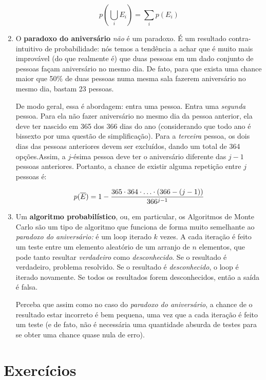 \documentclass{article}
\begin{document}
\begin{enumerate}
        \[ p\left(\bigcup_i E_i\right) = \sum_i p(E_i) \] 

    \item O \textbf{paradoxo do aniversário} \textit{não} é um paradoxo. É um resultado contra-intuitivo de probabilidade: nós temos a tendência a achar que é muito mais improvável (do que realmente é) que duas pessoas em um dado conjunto de pessoas façam aniversário no mesmo dia. De fato, para que exista uma chance maior que 50\% de duas pessoas numa mesma sala fazerem aniversário no mesmo dia, bastam 23 pessoas.

        De modo geral, essa é abordagem: entra uma pessoa. Entra uma \textit{segunda} pessoa. Para ela não fazer aniversário no mesmo dia da pessoa anterior, ela deve ter nascido em 365 dos 366 dias do ano (considerando que todo ano é bissexto por uma questão de simplificação). Para a \textit{terceira} pessoa, os dois dias das pessoas anteriores devem ser excluídos, dando um total de 364 opções.Assim, a \( j \)-ésima pessoa deve ter o aniversário diferente das \( j - 1 \) pessoas anteriores. Portanto, a chance de existir alguma repetição entre \( j \) pessoas é:

        \[ p(\overline{E}) = 1 - \frac{365 \cdot 364 \cdot \mathellipsis \cdot (366 - (j - 1))}{366^{j-1}} \] 

    \sloppy \item Um \textbf{algoritmo probabilístico}, ou, em particular, os Algoritmos de Monte Carlo são um tipo de algoritmo que funciona de forma muito semelhante ao \textit{paradoxo do aniversário:} é um loop iterado \( k \) vezes. A cada iteração é feito um teste entre um elemento aleatório de um arranjo de \( n\) elementos, que pode tanto resultar \textit{verdadeiro} como \textit{desconhecido}. Se o resultado é verdadeiro, problema resolvido. Se o resultado é \textit{desconhecido}, o loop é iterado novamente. Se todos os resultados forem desconhecidos, então a saída é falsa. 

        Perceba que assim como no caso do \textit{paradoxo do aniversário}, a chance de o resultado estar incorreto é bem pequena, uma vez que a cada iteração é feito um teste (e de fato, não é necessária uma quantidade absurda de testes para se obter uma chance quase nula de erro).

\end{enumerate}
\newpage
\section*{Exercícios}
\end{document}
